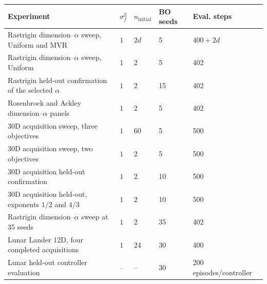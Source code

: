\begin{tabular}{@{}p{}llll@{}}
\toprule
Experiment & $\sigma_f^2$ & $n_{\mathrm{initial}}$ & BO seeds & Eval. steps \\
\midrule
Rastrigin dimension--$\alpha$ sweep, Uniform and MVR & $1$ & $2d$ & 5 & $400+2d$ \\
Rastrigin dimension--$\alpha$ sweep, Uniform & $1$ & 2 & 5 & 402 \\
Rastrigin held-out confirmation of the selected $\alpha$ & $1$ & 2 & 15 & 402 \\
Rosenbrock and Ackley dimension--$\alpha$ panels & $1$ & 2 & 5 & 402 \\
30D acquisition sweep, three objectives & $1$ & 60 & 5 & 500 \\
30D acquisition sweep, two objectives & $1$ & 2 & 5 & 500 \\
30D acquisition held-out confirmation & $1$ & 2 & 10 & 500 \\
30D acquisition held-out, exponents $1/2$ and $4/3$ & $1$ & 2 & 10 & 500 \\
Rastrigin dimension--$\alpha$ sweep at 35 seeds & $1$ & 2 & 35 & 402 \\
Lunar Lander 12D, four completed acquisitions & $1$ & 24 & 30 & 400 \\
Lunar held-out controller evaluation & -- & -- & 30 & 200 episodes/controller \\
\bottomrule
\end{tabular}
